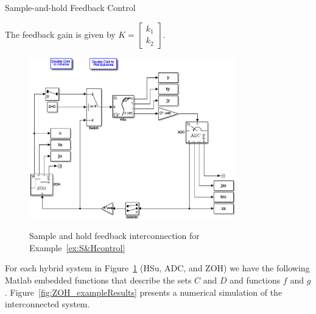 \begin{example}{Sample-and-hold Feedback Control}
\begin{itemize}
\end{itemize}

The feedback gain is given by $K = \begin{bmatrix}k_1\\k_2\end{bmatrix}$. 


\begin{figure}[ht!]
  \begin{center}
    {\includegraphics[width=0.8\textwidth]{figures/Simulink/SampleandHoldExample.eps}}
   \caption{Sample and hold feedback interconnection for Example~\ref{ex:S&Hcontrol}}
\label{fig:S&Hcontrol}
  \end{center}
\end{figure}

For each hybrid system in Figure~\ref{fig:S&Hcontrol} (HSu, ADC, and ZOH) we have the following Matlab embedded functions that describe the sets $C$ and $D$ and functions $f$ and $g$.
Figure~\ref{fig:ZOH_exampleResults} presents a numerical simulation of the interconnected system.


\end{example}
